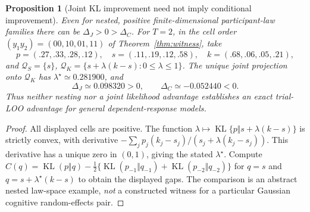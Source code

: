\documentclass[11pt,letterpaper]{article}
\theoremstyle{plain}
\newtheorem{proposition}[theorem]{Proposition}
\theoremstyle{definition}
\newcommand{\KL}{\operatorname{KL}}
\begin{document}
\begin{proposition}[Joint KL improvement need not imply conditional improvement]\label{prop:reversal}
Even for nested, positive finite-dimensional participant-law families there can be $\Delta_J>0>\Delta_C$. For $T=2$, in the cell order $(y_1y_2)=(00,10,01,11)$ of Theorem~\ref{thm:witness}, take
\[
p=(.27,.33,.28,.12),\quad s=(.11,.19,.12,.58),\quad k=(.68,.06,.05,.21),
\]
and $\mathcal Q_S=\{s\}$, $\mathcal Q_K=\{s+\lambda(k-s):0\le\lambda\le1\}$. The unique joint projection onto $\mathcal Q_K$ has $\lambda^\star\simeq0.281900$, and
\[
\Delta_J\simeq0.098320>0,\qquad \Delta_C\simeq-0.052440<0.
\]
Thus neither nesting nor a joint likelihood advantage establishes an exact trial-LOO advantage for general dependent-response models.
\end{proposition}
\begin{proof}
All displayed cells are positive. The function $\lambda\mapsto\KL\{p\Vert s+\lambda(k-s)\}$ is strictly convex, with derivative $-\sum_jp_j(k_j-s_j)/(s_j+\lambda(k_j-s_j))$. This derivative has a unique zero in $(0,1)$, giving the stated $\lambda^\star$. Compute $C(q)=\KL(p\Vert q)-\frac12\{\KL(p_{-1}\Vert q_{-1})+\KL(p_{-2}\Vert q_{-2})\}$ for $q=s$ and $q=s+\lambda^\star(k-s)$ to obtain the displayed gaps. The comparison is an abstract nested law-space example, \emph{not} a constructed witness for a particular Gaussian cognitive random-effects pair.
\end{proof}
\end{document}

